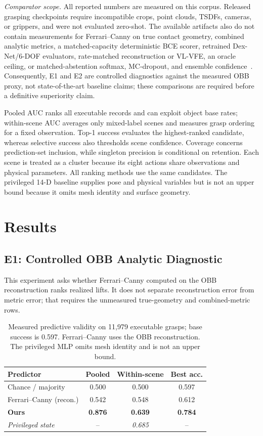 \documentclass[letterpaper, 10pt, conference]{ieeeconf}
\begin{document}
\emph{Comparator scope.} All reported numbers are measured on this corpus.
Released grasping checkpoints require incompatible crops, point clouds, TSDFs,
cameras, or grippers, and were not evaluated zero-shot. The available
artifacts also do not contain measurements for Ferrari--Canny on true contact
geometry, combined analytic metrics, a matched-capacity deterministic BCE
scorer, retrained Dex-Net/6-DOF evaluators, rate-matched reconstruction or
VL-VFE, an oracle ceiling, or matched-abstention softmax, MC-dropout, and
ensemble confidence~\cite{geifman2017selective,gal2016dropout,%
lakshminarayanan2017}. Consequently, E1 and E2 are controlled diagnostics
against the measured OBB proxy, not state-of-the-art baseline claims; these
comparisons are required before a definitive superiority claim.

Pooled AUC ranks all executable records and can exploit object base rates;
within-scene AUC averages only mixed-label scenes and measures grasp ordering
for a fixed observation. Top-1 success evaluates the highest-ranked candidate,
whereas selective success also thresholds scene confidence. Coverage concerns
prediction-set inclusion, while singleton precision is conditional on
retention. Each scene is treated as a cluster because its eight actions share
observations and physical parameters. All ranking methods use the same
candidates. The privileged 14-D baseline supplies pose and physical variables
but is not an upper bound because it omits mesh identity and surface geometry.

\section{Results}
\label{sec:results}

\subsection{E1: Controlled OBB Analytic Diagnostic}
\label{sec:e1}
This experiment asks whether Ferrari--Canny computed on the OBB reconstruction
ranks realized lifts. It does not separate reconstruction error from metric
error; that requires the unmeasured true-geometry and combined-metric rows.

\begin{table}[t]
\centering
\caption{Measured predictive validity on 11{,}979 executable grasps; base
success is 0.597. Ferrari--Canny uses the OBB reconstruction. The privileged
MLP omits mesh identity and is not an upper bound.}
\label{tab:proxy}
\small
\begin{tabular}{lccc}
\toprule
Predictor & Pooled & Within-scene & Best acc.\\
\midrule
Chance / majority & 0.500 & 0.500 & 0.597 \\
Ferrari--Canny (recon.) & 0.542 & 0.548 & 0.612 \\
\textbf{Ours} & \textbf{0.876} & \textbf{0.639} & \textbf{0.784} \\
\midrule
\emph{Privileged state} & -- & \emph{0.685} & -- \\
\bottomrule
\end{tabular}
\end{table}
\end{document}
